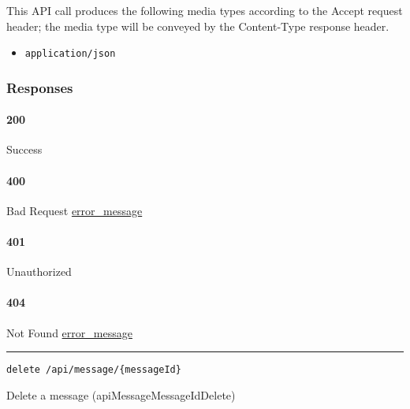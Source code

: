 This API call produces the following media types according to the
{Accept} request header; the media type will be conveyed by the
{Content-Type} response header.

\begin{itemize}
\tightlist
\item
  \texttt{application/json}
\end{itemize}

\hypertarget{responses-91}{%
\subsubsection{Responses}\label{responses-91}}

\hypertarget{section-297}{%
\paragraph{200}\label{section-297}}

Success

\hypertarget{section-298}{%
\paragraph{400}\label{section-298}}

Bad Request \protect\hyperlink{error_message}{error\_message}

\hypertarget{section-299}{%
\paragraph{401}\label{section-299}}

Unauthorized \protect\hyperlink{}{}

\hypertarget{section-300}{%
\paragraph{404}\label{section-300}}

Not Found \protect\hyperlink{error_message}{error\_message}

\begin{center}\rule{0.5\linewidth}{\linethickness}\end{center}

\protect\hypertarget{apiMessageMessageIdDelete}{}{}

\begin{verbatim}
delete /api/message/{messageId}
\end{verbatim}

Delete a message ({apiMessageMessageIdDelete})

